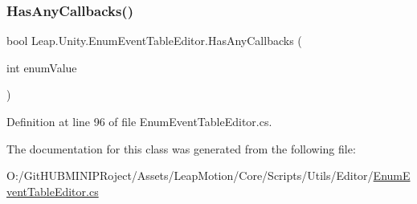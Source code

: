 \subsubsection{\texorpdfstring{HasAnyCallbacks()}{HasAnyCallbacks()}}
{\footnotesize\ttfamily bool Leap.\+Unity.\+Enum\+Event\+Table\+Editor.\+Has\+Any\+Callbacks (\begin{DoxyParamCaption}\item[{int}]{enum\+Value }\end{DoxyParamCaption})}



Definition at line 96 of file Enum\+Event\+Table\+Editor.\+cs.



The documentation for this class was generated from the following file\+:\begin{DoxyCompactItemize}
\item 
O\+:/\+Git\+H\+U\+B\+M\+I\+N\+I\+P\+Roject/\+Assets/\+Leap\+Motion/\+Core/\+Scripts/\+Utils/\+Editor/\mbox{\hyperlink{_enum_event_table_editor_8cs}{Enum\+Event\+Table\+Editor.\+cs}}\end{DoxyCompactItemize}
